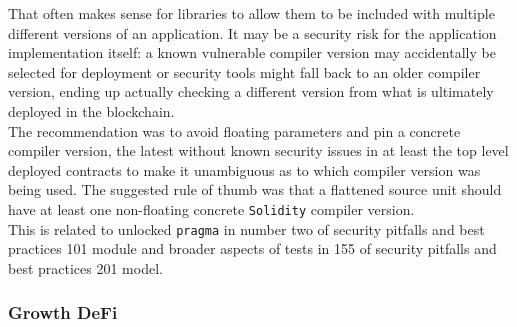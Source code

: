 \begin{itemize}
  That often makes sense for libraries to allow them to be included with
  multiple different versions of an application. It may be a security
  risk for the application implementation itself: a known vulnerable
  compiler version may accidentally be selected for deployment or
  security tools might fall back to an older compiler version, ending up
  actually checking a different version from what is ultimately deployed
  in the blockchain.\\

  The recommendation was to avoid floating parameters and pin a concrete
  compiler version, the latest without known security issues in at least
  the top level deployed contracts to make it unambiguous as to which
  compiler version was being used. The suggested rule of thumb was that
  a flattened source unit should have at least one non-floating concrete
  \texttt{Solidity} compiler version.\\

  This is related to unlocked \texttt{pragma} in number two of security
  pitfalls and best practices 101 module and broader aspects of tests in
  155 of security pitfalls and best practices 201 model.
\end{itemize}

\subsubsection{Growth DeFi}\label{growth-defi}

